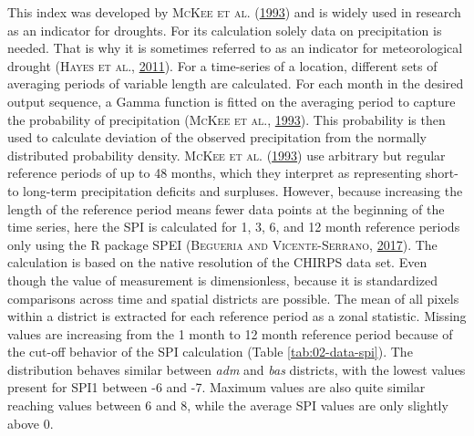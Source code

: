 \documentclass[a4paper,11pt]{article}
\begin{document}
This index was developed by \textsc{\textnormal{McKee} \textnormal{et al.}} \textsc{(\textnormal{\protect\hyperlink{ref-mckee1993}{1993}})} and is widely used in research as an indicator
for droughts. For its calculation solely data on precipitation is needed. That is why
it is sometimes referred to as an indicator for meteorological drought \textsc{(\textnormal{\textsc{Hayes} \textsc{et al.}}, \textnormal{\protect\hyperlink{ref-hayes2011}{2011}})}.
For a time-series of a location, different sets of averaging periods of variable length
are calculated. For each month in the desired output sequence, a Gamma function
is fitted on the averaging period to capture the probability of precipitation \textsc{(\textnormal{\textsc{McKee} \textsc{et al.}}, \textnormal{\protect\hyperlink{ref-mckee1993}{1993}})}.
This probability is then used to calculate deviation of the observed precipitation
from the normally distributed probability density. \textsc{\textnormal{McKee} \textnormal{et al.}} \textsc{(\textnormal{\protect\hyperlink{ref-mckee1993}{1993}})} use arbitrary but
regular reference periods of up to 48 months, which they interpret as representing
short- to long-term precipitation deficits and surpluses. However, because
increasing the length of the reference period means fewer data points at the
beginning of the time series, here the SPI is calculated for 1, 3, 6, and 12
month reference periods only using the R package SPEI \textsc{(\textnormal{\textsc{Begueria} and \textsc{Vicente-Serrano}}, \textnormal{\protect\hyperlink{ref-begueria2017}{2017}})}. The
calculation is based on the native resolution of the CHIRPS data set. Even though
the value of measurement is dimensionless, because it is standardized comparisons
across time and spatial districts are possible. The mean of all pixels within
a district is extracted for each reference period as a zonal statistic.
Missing values are increasing from the 1 month to 12 month reference
period because of the cut-off behavior of the SPI calculation (Table \ref{tab:02-data-spi}).
The distribution behaves similar between \emph{adm} and \emph{bas} districts, with the
lowest values present for SPI1 between -6 and -7. Maximum values are also quite
similar reaching values between 6 and 8, while the average SPI values are only
slightly above 0.

\newpage
\end{document}
